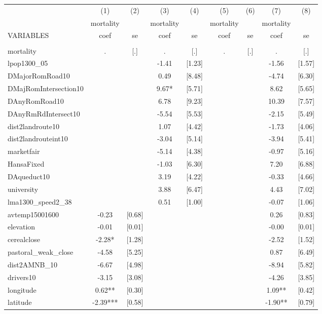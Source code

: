 \documentclass[landscape]{article}
\begin{document}
\begin{tabular}{lcccccccc} \hline
 & (1) & (2) & (3) & (4) & (5) & (6) & (7) & (8) \\
 & mortality &  & mortality &  & mortality &  & mortality &  \\
VARIABLES & coef & se & coef & se & coef & se & coef & se \\ \hline
 &  &  &  &  &  &  &  &  \\
mortality & . & [.] & . & [.] & . & [.] & . & [.] \\
lpop1300\_05 &  &  & -1.41 & [1.23] &  &  & -1.56 & [1.57] \\
DMajorRomRoad10 &  &  & 0.49 & [8.48] &  &  & -4.74 & [6.30] \\
DMajRomIntersection10 &  &  & 9.67* & [5.71] &  &  & 8.62 & [5.65] \\
DAnyRomRoad10 &  &  & 6.78 & [9.23] &  &  & 10.39 & [7.57] \\
DAnyRmRdIntersect10 &  &  & -5.54 & [5.53] &  &  & -2.15 & [5.49] \\
dist2landroute10 &  &  & 1.07 & [4.42] &  &  & -1.73 & [4.06] \\
dist2landrouteint10 &  &  & -3.04 & [5.14] &  &  & -3.94 & [5.41] \\
marketfair &  &  & -5.14 & [4.38] &  &  & -0.97 & [5.16] \\
HansaFixed &  &  & -1.03 & [6.30] &  &  & 7.20 & [6.88] \\
DAqueduct10 &  &  & 3.19 & [4.22] &  &  & -0.33 & [4.66] \\
university &  &  & 3.88 & [6.47] &  &  & 4.43 & [7.02] \\
lma1300\_speed2\_38 &  &  & 0.51 & [1.00] &  &  & -0.07 & [1.06] \\
avtemp15001600 & -0.23 & [0.68] &  &  &  &  & 0.26 & [0.83] \\
elevation & -0.01 & [0.01] &  &  &  &  & -0.00 & [0.01] \\
cerealclose & -2.28* & [1.28] &  &  &  &  & -2.52 & [1.52] \\
pastoral\_weak\_close & -4.58 & [5.25] &  &  &  &  & 0.87 & [6.49] \\
dist2AMNB\_10 & -6.67 & [4.98] &  &  &  &  & -8.94 & [5.82] \\
drivers10 & -3.15 & [3.08] &  &  &  &  & -4.26 & [3.85] \\
longitude & 0.62** & [0.30] &  &  &  &  & 1.09** & [0.42] \\
latitude & -2.39*** & [0.58] &  &  &  &  & -1.90** & [0.79] \\

\end{tabular}
\end{document}
